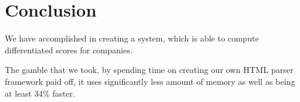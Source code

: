 \documentclass[10pt]{IEEEtran}
\begin{document}
\section{Conclusion}
We have accomplished in creating a system, which is able to compute differentiated scores for companies. 

The gamble that we took, by spending time on creating our own HTML parser framework paid off, it uses significantly less amount of memory as well as being at least 34\% faster.



\end{document}
